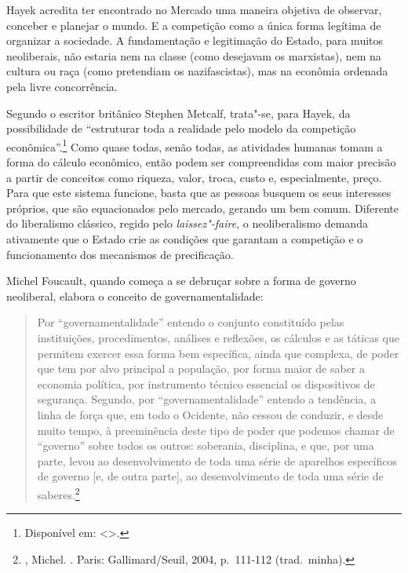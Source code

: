 Hayek acredita ter encontrado no Mercado uma maneira objetiva de observar, conceber e planejar o mundo. E a competição como a única forma legítima de organizar a sociedade. A fundamentação e
legitimação do Estado, para muitos neoliberais, não estaria nem na
classe (como desejavam os marxistas), nem na cultura ou raça (como
pretendiam os nazifascistas), mas na econômia ordenada pela livre
concorrência.

Segundo o escritor britânico Stephen Metcalf, trata"-se, para Hayek, da possibilidade de ``estruturar toda a realidade pelo modelo da competição
econômica''.\footnote{Disponível em: \textless{}{}\textgreater{}.}
Como quase todas, senão todas, as atividades humanas tomam a forma do
cálculo econômico, então podem ser compreendidas com maior precisão a
partir de conceitos como riqueza, valor, troca, custo e, especialmente,
preço. Para que este sistema funcione, basta que as pessoas busquem os
seus interesses próprios, que são equacionados pelo mercado, gerando um
bem comum. Diferente do liberalismo clássico, regido pelo \emph{laissez"-faire},
o neoliberalismo demanda ativamente que o Estado crie as condições que
garantam a competição e o funcionamento dos mecanismos de precificação.

Michel Foucault, quando começa a se debruçar sobre a forma de governo
neoliberal, elabora o conceito de governamentalidade:

\begin{quote}
Por ``governamentalidade'' entendo o conjunto constituído pelas
instituições, procedimentos, análises e reﬂexões, os cálculos e as
táticas que permitem exercer essa forma bem especíﬁca, ainda que
complexa, de poder que tem por alvo principal a população, por forma
maior de saber a economia política, por instrumento técnico essencial os
dispositivos de segurança. Segundo, por ``governamentalidade'' entendo a
tendência, a linha de força que, em todo o Ocidente, não cessou de
conduzir, e desde muito tempo, à preeminência deste tipo de poder que
podemos chamar de ``governo'' sobre todos os outros: soberania,
disciplina, e que, por uma parte, levou ao desenvolvimento de toda uma
série de aparelhos especíﬁcos de governo {[}e, de outra parte{]}, ao
desenvolvimento de toda uma série de saberes.\footnote{,
  Michel. {}. Paris: Gallimard/Seuil, 2004, p.~111-112 (trad.~minha).}
\end{quote}

